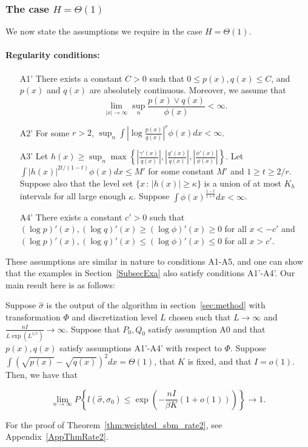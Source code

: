 \documentclass{article}
\begin{document}
\subsubsection{The case $H = \Theta(1)$}

We now state the assumptions we require in the case $H = \Theta(1)$.

\paragraph{\textbf{Regularity conditions:}} 

\begin{enumerate}
\item[A1'] There exists a constant $C >0$ such that $0 \leq p(x), q(x) \leq C$, and $p(x)$ and $q(x)$ are absolutely continuous.  Moreover, we assume that 
$$\lim_{|x| \rightarrow \infty} \sup_n \frac{p(x) \vee q(x)}{\phi(x)} < \infty.$$
\item[A2'] For some $r > 2$, $\sup_n \int \left| \log \frac{p(x)}{q(x)} \right|^r \phi(x) dx < \infty$.
\item[A3'] Let $h(x) \geq \sup_n \max \left\{  \left|\frac{\gamma'(x)}{q(x)} \right|, 
 \left|\frac{q'(x)}{q(x)}\right|, \left| \frac{\phi'(x)}{\phi(x)}\right|  \right\} $. Let $\int |h(x)|^{2t/(1-t)} \phi(x) dx \leq M'$ for some constant $M'$ and $1 \geq t \geq 2/r$. Suppose also that the level set $\{x \,:\, |h(x)| \geq \kappa\}$ is a union of at most $K_h$ intervals for all large enough $\kappa$. Suppose $\int \phi(x)^{\frac{1-t}{1+t}} dx < \infty$.
\item[A4']  There exists a constant $c'>0$ such that $(\log p)'(x), (\log q)'(x) \geq (\log \phi)'(x) \geq 0$ for all $x < -c'$ and $ (\log p)'(x), (\log q)'(x) \leq (\log \phi)'(x) \leq 0$ for all $x > c'$.
\end{enumerate}

These assumptions are similar in nature to conditions A1-A5, and one can show that the examples in Section~\ref{SubsecExa} also satisfy conditions A1'-A4'. Our main result here is as follows:

\begin{theorem}
\label{thm:weighted_sbm_rate2}
Suppose $\hat{\sigma}$ is the output of the algorithm in section~\ref{sec:method} with transformation $\Phi$ and discretization level $L$ chosen such that $L \rightarrow \infty$ and $\frac{n I}{ L \exp(L^{1/r}) } \rightarrow \infty$. Suppose that $P_0, Q_0$ satisfy assumption A0 and that $p(x), q(x)$ satisfy assumptions A1'-A4' with respect to $\Phi$. Suppose $\int (\sqrt{p(x)} - \sqrt{q(x)})^2 dx = \Theta(1)$, that $K$ is fixed, and that $I = o(1)$. Then, we have that

\[
\lim_{n \rightarrow \infty} P \left\{
     l(\hat{\sigma}, \sigma_0) \leq \exp\left( - \frac{nI}{\beta K} (1 + o(1)) \right)
    \right\} \rightarrow 1.
\]
\end{theorem}
For the proof of Theorem~\ref{thm:weighted_sbm_rate2}, see Appendix~\ref{AppThmRate2}.
\end{document}
